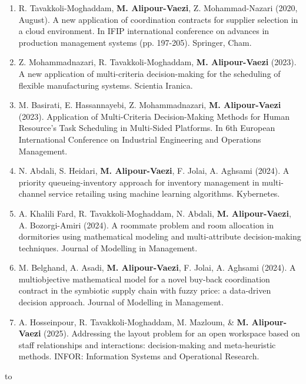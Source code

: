 \documentclass[9pt,a4paper]{extarticle}
\newcommand{\SectionFont}
    {\fontsize{11}{12.5}\selectfont}
\newcommand{\BodyFont}
    {\fontsize{8.5}{9.30}\selectfont}
\newlength{\CVSectionBefore}
\newlength{\CVSectionAfter}
\newcommand{\cvsection}[1]{%
    \par
    \vspace{\CVSectionBefore}%
    \noindent
    \hbox to \textwidth{%
        {\SectionFont\bfseries\color{black}#1}%
        \hspace{0.40em}%
        \hrulefill
    }%
    \par
    \vspace{\CVSectionAfter}%
}
\newenvironment{cvcatlist}{%
    \begin{itemize}[
        leftmargin=0pt,
        labelsep=0pt,
        label={},
        topsep=0pt,
        itemsep=-0.5pt,
        parsep=0pt,
        partopsep=0pt
    ]
}{%
    \end{itemize}
}
\newenvironment{cvsublist}{%
    \begin{enumerate}[
        leftmargin=0.24in,
        labelsep=0.04in,
        label={\BodyFont\color{CVBody}\arabic*.},
        start=1,
        topsep=-0.8pt,
        itemsep=-0.8pt,
        parsep=0pt,
        partopsep=0pt
    ]
}{%
    \end{enumerate}
}
\newcommand{\pubitem}[1]{%
    \item\relax
    {\BodyFont\color{CVBody}\ignorespaces#1\unskip}%
}
\begin{document}
\begin{cvcatlist}
\begin{cvsublist}
\pubitem{
R. Tavakkoli-Moghaddam,
\textbf{M. Alipour-Vaezi},
Z. Mohammad-Nazari
(2020, August).
A new application of coordination contracts
for supplier selection in a cloud environment.
In IFIP international conference
on advances in production management systems
(pp. 197-205).
Springer, Cham.
}

\pubitem{
Z. Mohammadnazari,
R. Tavakkoli-Moghaddam,
\textbf{M. Alipour-Vaezi}
(2023).
A new application of multi-criteria decision-making
for the scheduling of flexible manufacturing systems.
Scientia Iranica.
}

\pubitem{
M. Basirati,
E. Hassannayebi,
Z. Mohammadnazari,
\textbf{M. Alipour-Vaezi}
(2023).
Application of Multi-Criteria Decision-Making Methods
for Human Resource’s Task Scheduling in Multi-Sided Platforms.
In 6th European International Conference
on Industrial Engineering and Operations Management.
}

\pubitem{
N. Abdali,
S. Heidari,
\textbf{M. Alipour-Vaezi},
F. Jolai,
A. Aghsami
(2024).
A priority queueing-inventory approach
for inventory management in multi-channel service retailing
using machine learning algorithms.
Kybernetes.
}

\pubitem{
A. Khalili Fard,
R. Tavakkoli-Moghaddam,
N. Abdali,
\textbf{M. Alipour-Vaezi},
A. Bozorgi-Amiri
(2024).
A roommate problem and room allocation in dormitories
using mathematical modeling
and multi-attribute decision-making techniques.
Journal of Modelling in Management.
}

\pubitem{
M. Belghand,
A. Asadi,
\textbf{M. Alipour-Vaezi},
F. Jolai,
A. Aghsami
(2024).
A multiobjective mathematical model
for a novel buy-back coordination contract
in the symbiotic supply chain with fuzzy price:
a data-driven decision approach.
Journal of Modelling in Management.
}

\pubitem{
A. Hosseinpour,
R. Tavakkoli-Moghaddam,
M. Mazloum,
\&
\textbf{M. Alipour-Vaezi}
(2025).
Addressing the layout problem for an open workspace
based on staff relationships and interactions:
decision-making and meta-heuristic methods.
INFOR:
Information Systems and Operational Research.
}

\end{cvsublist}

\end{cvcatlist}


\cvsection{Patents}
\end{document}
